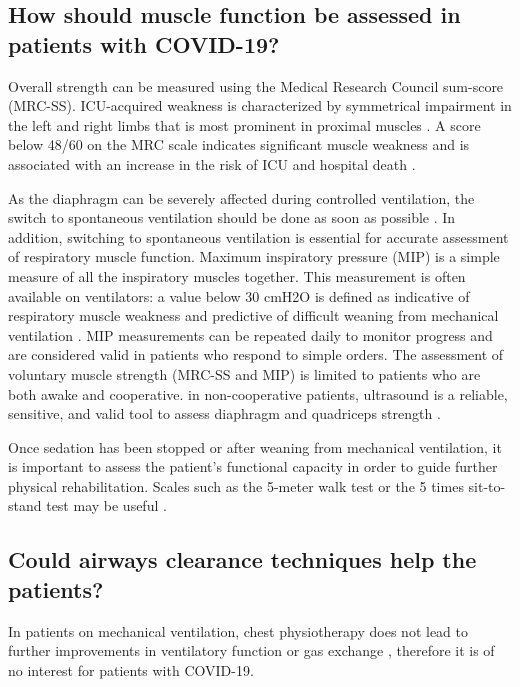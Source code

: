 \subsection{How should muscle function be assessed in patients with COVID-19?}
Overall strength can be measured using the Medical Research Council sum-score (MRC-SS). ICU-acquired weakness is characterized by symmetrical impairment in the left and right limbs that is most prominent in proximal muscles \cite{vanhorebeek2020icu}. A score below 48/60 on the MRC scale indicates significant muscle weakness and is associated with an increase in the risk of ICU and hospital death \cite{medrinal_icu_2020}.

As the diaphragm can be severely affected during controlled ventilation, the switch to spontaneous ventilation should be done as soon as possible \cite{schepens_diaphragm_2020}. In addition, switching to spontaneous ventilation is essential for accurate assessment of respiratory muscle function. Maximum inspiratory pressure (MIP) is a simple measure of all the inspiratory muscles together. This measurement is often available on ventilators: a value below 30 cmH2O is defined as indicative of respiratory muscle weakness and predictive of difficult weaning from mechanical ventilation \cite{medrinal_respiratory_2016}. MIP measurements can be repeated daily to monitor progress and are considered valid in patients who respond to simple orders. The assessment of voluntary muscle strength (MRC-SS and MIP) is limited to patients who are both awake and cooperative. in non-cooperative patients, ultrasound is a reliable, sensitive, and valid tool to assess diaphragm \cite{dube_ultrasound_2017,jung_diaphragmatic_2016,le_neindre_thoracic_2016} and quadriceps strength \cite{formenti_clinical_2019}. 

Once sedation has been stopped or after weaning from mechanical ventilation, it is important to assess the patient’s functional capacity in order to guide further physical rehabilitation. Scales such as the 5-meter walk test or the 5 times sit-to-stand test may be useful \cite{nordon-craft_intensive_2012,haley_linking_2011}.

\subsection{Could airways clearance techniques help the patients?}

In patients on mechanical ventilation, chest physiotherapy does not lead to further improvements in ventilatory function or gas exchange \cite{goncalves_effects_2016}, therefore it is of no interest for patients with COVID-19.

